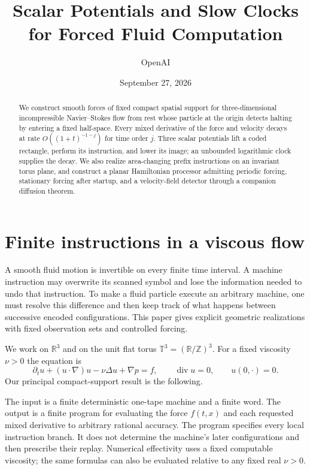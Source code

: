\documentclass[11pt]{article}
\title{Scalar Potentials and Slow Clocks for Forced Fluid Computation}
\author{OpenAI}
\date{September 27, 2026}
\begin{document}
\maketitle
\begin{abstract}
We construct smooth forces of fixed compact spatial support for three-dimensional incompressible Navier--Stokes flow from rest whose particle at the origin detects halting by entering a fixed half-space. Every mixed derivative of the force and velocity decays at rate $O((1+t)^{-1-j})$ for time order $j$. Three scalar potentials lift a coded rectangle, perform its instruction, and lower its image; an unbounded logarithmic clock supplies the decay. We also realize area-changing prefix instructions on an invariant torus plane, and construct a planar Hamiltonian processor admitting periodic forcing, stationary forcing after startup, and a velocity-field detector through a companion diffusion theorem.
\end{abstract}

\section{Finite instructions in a viscous flow}\label{sec:introduction}
A smooth fluid motion is invertible on every finite time interval. A machine instruction may overwrite its scanned symbol and lose the information needed to undo that instruction. To make a fluid particle execute an arbitrary machine, one must resolve this difference and then keep track of what happens between successive encoded configurations. This paper gives explicit geometric realizations with fixed observation sets and controlled forcing.

We work on $\mathbb R^3$ and on the unit flat torus $\mathbb T^3=(\mathbb R/\mathbb Z)^3$. For a fixed viscosity $\nu>0$ the equation is
\begin{equation}\label{eq:NS}
 \partial_tu+(u\cdot\nabla)u-\nu\Delta u+\nabla p=f,
 \qquad \operatorname{div}u=0,\qquad u(0,\cdot)=0.
\end{equation}
Our principal compact-support result is the following.



The input is a finite deterministic one-tape machine and a finite word. The output is a finite program for evaluating the force $f(t,x)$ and each requested mixed derivative to arbitrary rational accuracy. The program specifies every local instruction branch. It does not determine the machine's later configurations and then prescribe their replay. Numerical effectivity uses a fixed computable viscosity; the same formulas can also be evaluated relative to any fixed real $\nu>0$.
\end{document}
